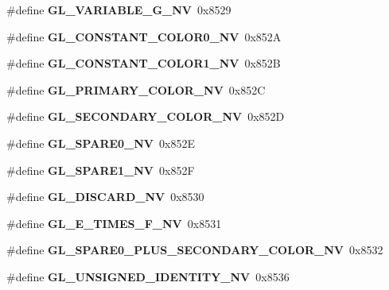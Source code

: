 \begin{DoxyCompactItemize}
\item 
\#define {\bfseries G\+L\+\_\+\+V\+A\+R\+I\+A\+B\+L\+E\+\_\+\+G\+\_\+\+N\+V}~0x8529\label{_s_d_l__opengl_8h_a64eb49850f09015df3c02ab7fe2fbe0d}

\item 
\#define {\bfseries G\+L\+\_\+\+C\+O\+N\+S\+T\+A\+N\+T\+\_\+\+C\+O\+L\+O\+R0\+\_\+\+N\+V}~0x852\+A\label{_s_d_l__opengl_8h_a352100abbffda4fb8763f771adb664f9}

\item 
\#define {\bfseries G\+L\+\_\+\+C\+O\+N\+S\+T\+A\+N\+T\+\_\+\+C\+O\+L\+O\+R1\+\_\+\+N\+V}~0x852\+B\label{_s_d_l__opengl_8h_a659b1d6a4709678df49b74148425a820}

\item 
\#define {\bfseries G\+L\+\_\+\+P\+R\+I\+M\+A\+R\+Y\+\_\+\+C\+O\+L\+O\+R\+\_\+\+N\+V}~0x852\+C\label{_s_d_l__opengl_8h_a4c678d734016b53f2d57bf4466b45440}

\item 
\#define {\bfseries G\+L\+\_\+\+S\+E\+C\+O\+N\+D\+A\+R\+Y\+\_\+\+C\+O\+L\+O\+R\+\_\+\+N\+V}~0x852\+D\label{_s_d_l__opengl_8h_a1cdfbb05f432e472e337d5077ba42440}

\item 
\#define {\bfseries G\+L\+\_\+\+S\+P\+A\+R\+E0\+\_\+\+N\+V}~0x852\+E\label{_s_d_l__opengl_8h_a4dce054391cd554881fd7cbe7e5ea379}

\item 
\#define {\bfseries G\+L\+\_\+\+S\+P\+A\+R\+E1\+\_\+\+N\+V}~0x852\+F\label{_s_d_l__opengl_8h_a6ec220f12ae58fa5c64e92dd9d1a48bd}

\item 
\#define {\bfseries G\+L\+\_\+\+D\+I\+S\+C\+A\+R\+D\+\_\+\+N\+V}~0x8530\label{_s_d_l__opengl_8h_ae68786cfd2f64aab537e4224bea9d9f9}

\item 
\#define {\bfseries G\+L\+\_\+\+E\+\_\+\+T\+I\+M\+E\+S\+\_\+\+F\+\_\+\+N\+V}~0x8531\label{_s_d_l__opengl_8h_adb43bdfd4107d85aaf91932e56f050bf}

\item 
\#define {\bfseries G\+L\+\_\+\+S\+P\+A\+R\+E0\+\_\+\+P\+L\+U\+S\+\_\+\+S\+E\+C\+O\+N\+D\+A\+R\+Y\+\_\+\+C\+O\+L\+O\+R\+\_\+\+N\+V}~0x8532\label{_s_d_l__opengl_8h_ac039c3e9f3bd330d587b25b7ec972458}

\item 
\#define {\bfseries G\+L\+\_\+\+U\+N\+S\+I\+G\+N\+E\+D\+\_\+\+I\+D\+E\+N\+T\+I\+T\+Y\+\_\+\+N\+V}~0x8536\label{_s_d_l__opengl_8h_a817936bba382e9bec560664aa31e5e76}


\end{DoxyCompactItemize}
